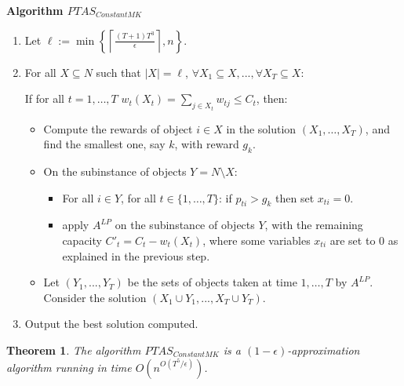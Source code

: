 \documentclass[a4paper]{book}
\newtheorem{theorem}{Theorem}[chapter]
\begin{document}
\textbf{Algorithm $PTAS_{ConstantMK}$}
\begin{enumerate}
  \item Let $\ell:=\min\left\{\left\lceil \frac{(T+1)T^3}{\epsilon}\right\rceil,n\right\}$.
  \item For all $X \subseteq N$ such that $|X| =\ell$, $\forall X_1\subseteq X, ...,  \forall X_T\subseteq X$: 
 
   If for all $t=1,\dots,T$ $w_t(X_t) = \sum\limits_{j \in X_t} w_{tj} \leq C_t$, then:
   \begin{itemize}
   \item Compute the rewards of object $i\in X$ in the solution $(X_1,\dots,X_T)$, and find the smallest one, say $k$, with reward $g_k$. 
   \item On the subinstance of objects $Y=N\setminus X$: 
   	\begin{itemize}
   	 \item For all $i \in Y$, for all $t \in \{1,\dots,T\}$: if $p_{ti} > g_{k}$ then set $x_{ti} =0$.
     \item apply $A^{LP}$ on the subinstance of objects $Y$, with the remaining capacity $C'_t=C_t-w_t(X_t)$, where some variables $x_{ti}$ are set to 0 as explained in the previous step.
     \end{itemize}
  \item Let $(Y_1,..., Y_T)$ be the sets of objects taken at time $1,\dots,T$ by  $A^{LP}$. Consider the solution $(X_1\cup Y_1,...,X_T\cup Y_T)$.
  \end{itemize}
  \item Output the best solution computed.
\end{enumerate}


\begin{theorem}\label{theo:ptasconstant}
The algorithm $PTAS_{ConstantMK}$ is a $(1-\epsilon)$-approximation algorithm running in time $O\left(n^{O(T^5/\epsilon)}\right)$.
\end{theorem}
\end{document}
